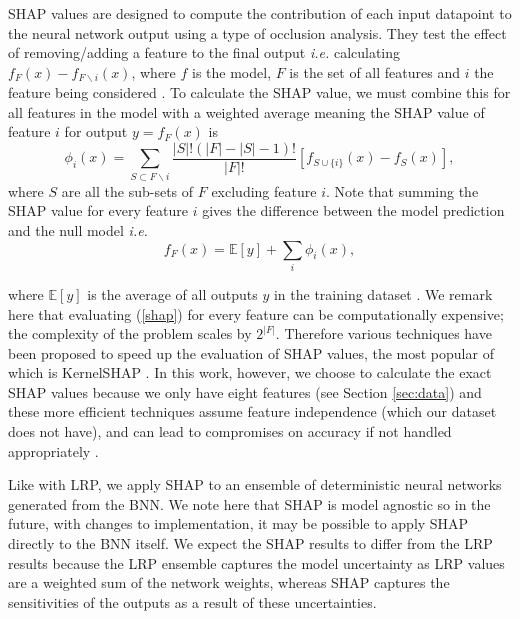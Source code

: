 \documentclass[a4paper]{article}
\begin{document}
SHAP values are designed to compute the contribution of each input datapoint to the neural network output using a type of occlusion analysis. They test the effect of removing/adding a feature to the final output \textit{i.e.} calculating $f_{F}(x) - f_{F\backslash i}(x)$, where $f$ is the model, $F$ is the set of all features and $i$ the feature being considered \citep{lundberg2017unified}. To calculate the SHAP value, we must combine this for all features in the model with a weighted average meaning the SHAP value of feature $i$ for output $y = f_{F}(x)$ is
\begin{equation}\label{shap}
    \phi_{i}(x) = \sum_{S \subset F\backslash i} \frac{\lvert S\rvert ! (\lvert F\rvert - \lvert S\rvert -1)!}{\lvert F\rvert !}[f_{S \cup \{i\}}(x) - f_{S}(x)],
\end{equation}
where $S$ are all the sub-sets of $F$ excluding feature $i$. Note that summing the SHAP value for every feature $i$ gives the difference between the model prediction and the null model \textit{i.e.}
\begin{equation}
    f_{F}(x) = \mathbb{E}[y] + \sum_{i} \phi_{i}(x),
\end{equation}

where $\mathbb{E}[y]$ is the average of all outputs $y$ in the training dataset \citep{mazzanti2020shap}. We remark here that evaluating (\ref{shap}) for every feature can be computationally expensive; the complexity of the problem scales by $2^{\lvert F\rvert}$. Therefore various techniques have been proposed to speed up the evaluation of SHAP values, the most popular of which is KernelSHAP \citep{lundberg2017unified}. In this work, however, we choose to calculate the exact SHAP values because we only have eight features (see Section \ref{sec:data}) and these more efficient techniques assume feature independence (which our dataset does not have), and can lead to compromises on accuracy if not handled appropriately \citep{aas2021explaining}.

Like with LRP, we apply SHAP to an ensemble of deterministic neural networks generated from the BNN. We note here that SHAP is model agnostic so in the future, with changes to implementation, it may be possible to apply SHAP directly to the BNN itself. We expect the SHAP results to differ from the LRP results because the LRP ensemble captures the model uncertainty as LRP values are a weighted sum of the network weights, whereas SHAP captures the sensitivities of the outputs as a result of these uncertainties.
\end{document}
